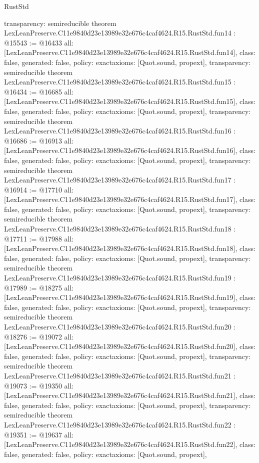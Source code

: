 \begin{lexlean}{RustStd}
\begin{coremodule}
{  transparency: semireducible
}
theorem LexLeanPreserve.C11e9840d23e13989e32e676c4caf4624.R15.RustStd.fun14 : @15543 := @16433 {
  all: [LexLeanPreserve.C11e9840d23e13989e32e676c4caf4624.R15.RustStd.fun14],
  class: false,
  generated: false,
  policy: exact{axioms: [Quot.sound, propext]},
  transparency: semireducible
}
theorem LexLeanPreserve.C11e9840d23e13989e32e676c4caf4624.R15.RustStd.fun15 : @16434 := @16685 {
  all: [LexLeanPreserve.C11e9840d23e13989e32e676c4caf4624.R15.RustStd.fun15],
  class: false,
  generated: false,
  policy: exact{axioms: [Quot.sound, propext]},
  transparency: semireducible
}
theorem LexLeanPreserve.C11e9840d23e13989e32e676c4caf4624.R15.RustStd.fun16 : @16686 := @16913 {
  all: [LexLeanPreserve.C11e9840d23e13989e32e676c4caf4624.R15.RustStd.fun16],
  class: false,
  generated: false,
  policy: exact{axioms: [Quot.sound, propext]},
  transparency: semireducible
}
theorem LexLeanPreserve.C11e9840d23e13989e32e676c4caf4624.R15.RustStd.fun17 : @16914 := @17710 {
  all: [LexLeanPreserve.C11e9840d23e13989e32e676c4caf4624.R15.RustStd.fun17],
  class: false,
  generated: false,
  policy: exact{axioms: [Quot.sound, propext]},
  transparency: semireducible
}
theorem LexLeanPreserve.C11e9840d23e13989e32e676c4caf4624.R15.RustStd.fun18 : @17711 := @17988 {
  all: [LexLeanPreserve.C11e9840d23e13989e32e676c4caf4624.R15.RustStd.fun18],
  class: false,
  generated: false,
  policy: exact{axioms: [Quot.sound, propext]},
  transparency: semireducible
}
theorem LexLeanPreserve.C11e9840d23e13989e32e676c4caf4624.R15.RustStd.fun19 : @17989 := @18275 {
  all: [LexLeanPreserve.C11e9840d23e13989e32e676c4caf4624.R15.RustStd.fun19],
  class: false,
  generated: false,
  policy: exact{axioms: [Quot.sound, propext]},
  transparency: semireducible
}
theorem LexLeanPreserve.C11e9840d23e13989e32e676c4caf4624.R15.RustStd.fun20 : @18276 := @19072 {
  all: [LexLeanPreserve.C11e9840d23e13989e32e676c4caf4624.R15.RustStd.fun20],
  class: false,
  generated: false,
  policy: exact{axioms: [Quot.sound, propext]},
  transparency: semireducible
}
theorem LexLeanPreserve.C11e9840d23e13989e32e676c4caf4624.R15.RustStd.fun21 : @19073 := @19350 {
  all: [LexLeanPreserve.C11e9840d23e13989e32e676c4caf4624.R15.RustStd.fun21],
  class: false,
  generated: false,
  policy: exact{axioms: [Quot.sound, propext]},
  transparency: semireducible
}
theorem LexLeanPreserve.C11e9840d23e13989e32e676c4caf4624.R15.RustStd.fun22 : @19351 := @19637 {
  all: [LexLeanPreserve.C11e9840d23e13989e32e676c4caf4624.R15.RustStd.fun22],
  class: false,
  generated: false,
  policy: exact{axioms: [Quot.sound, propext]},
}
\end{coremodule}
\end{lexlean}
